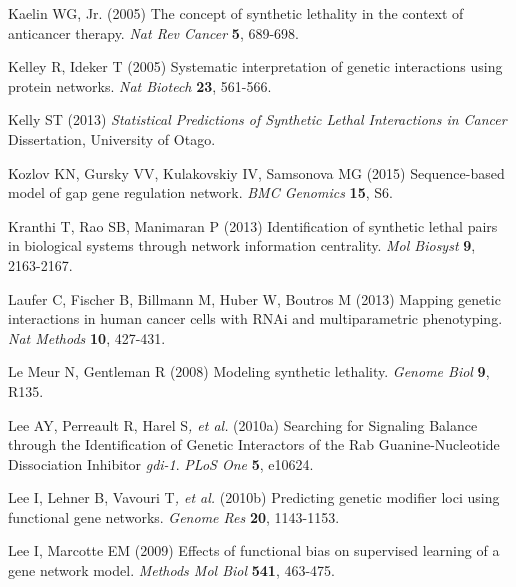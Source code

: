 \hypertarget{ENREF55}{}Kaelin WG, Jr. (2005) The concept of synthetic
lethality in the context of anticancer therapy. \textit{Nat Rev Cancer}
\textbf{5}, 689-698.



\hypertarget{ENREF56}{}Kelley R, Ideker T (2005) Systematic
interpretation of genetic interactions using protein networks.
\textit{Nat Biotech} \textbf{23}, 561-566.



Kelly ST (2013) \textit{Statistical Predictions of Synthetic Lethal
Interactions in Cancer} Dissertation, University of Otago.



\hypertarget{ENREF58}{}Kozlov KN, Gursky VV, Kulakovskiy IV, Samsonova
MG (2015) Sequence-based model of gap gene regulation network.
\textit{BMC Genomics} \textbf{15}, S6.



\hypertarget{ENREF59}{}Kranthi T, Rao SB, Manimaran P (2013)
Identification of synthetic lethal pairs in biological systems through
network information centrality. \textit{Mol Biosyst} \textbf{9},
2163-2167.



\hypertarget{ENREF60}{}Laufer C, Fischer B, Billmann M, Huber W, Boutros
M (2013) Mapping genetic interactions in human cancer cells with RNAi
and multiparametric phenotyping. \textit{Nat Methods} \textbf{10},
427-431.



\hypertarget{ENREF61}{}Le Meur N, Gentleman R (2008) Modeling synthetic
lethality. \textit{Genome Biol} \textbf{9}, R135.



\hypertarget{ENREF62}{}Lee AY, Perreault R, Harel S\textit{, et al.}
(2010a) Searching for Signaling Balance through the Identification of
Genetic Interactors of the Rab Guanine-Nucleotide Dissociation
Inhibitor \textit{gdi-1}. \textit{PLoS One} \textbf{5}, e10624.



\hypertarget{ENREF63}{}Lee I, Lehner B, Vavouri T\textit{, et al.}
(2010b) Predicting genetic modifier loci using functional gene
networks. \textit{Genome Res} \textbf{20}, 1143-1153.



\hypertarget{ENREF64}{}Lee I, Marcotte EM (2009) Effects of functional
bias on supervised learning of a gene network model. \textit{Methods
Mol Biol} \textbf{541}, 463-475.



